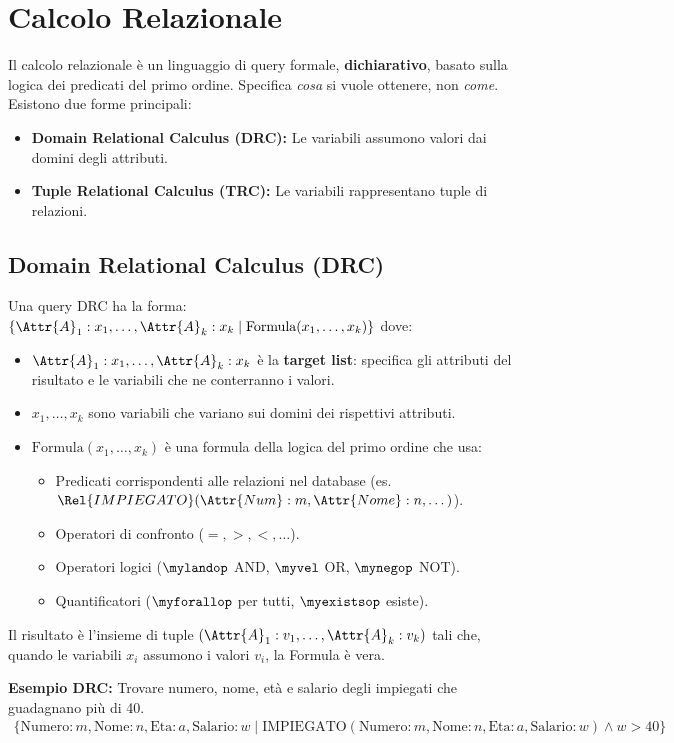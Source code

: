 \section{Calcolo Relazionale}
Il calcolo relazionale è un linguaggio di query formale, \textbf{dichiarativo}, basato sulla logica dei predicati del primo ordine. Specifica \textit{cosa} si vuole ottenere, non \textit{come}.
Esistono due forme principali:
\begin{itemize}
	\item \textbf{Domain Relational Calculus (DRC):} Le variabili assumono valori dai domini degli attributi.
	\item \textbf{Tuple Relational Calculus (TRC):} Le variabili rappresentano tuple di relazioni.
\end{itemize}

\subsection{Domain Relational Calculus (DRC)}
Una query DRC ha la forma:
$\{ \Attr{A}_1:x_1, \dots, \Attr{A}_k:x_k \mid \text{Formula}(x_1, \dots, x_k) \}$
dove:
\begin{itemize}
	\item $\Attr{A}_1:x_1, \dots, \Attr{A}_k:x_k$ è la \textbf{target list}: specifica gli attributi del risultato e le variabili che ne conterranno i valori.
	\item $x_1, \dots, x_k$ sono variabili che variano sui domini dei rispettivi attributi.
	\item $\text{Formula}(x_1, \dots, x_k)$ è una formula della logica del primo ordine che usa:
	\begin{itemize}
		\item Predicati corrispondenti alle relazioni nel database (es. $\Rel{IMPIEGATO}(\Attr{Num}:m, \Attr{Nome}:n, \dots)$).
		\item Operatori di confronto ($=, >, <, \dots$).
		\item Operatori logici ($\mylandop$ AND, $\myvel$ OR, $\mynegop$ NOT).
		\item Quantificatori ($\myforallop$ per tutti, $\myexistsop$ esiste).
	\end{itemize}
\end{itemize}
Il risultato è l'insieme di tuple $(\Attr{A}_1:v_1, \dots, \Attr{A}_k:v_k)$ tali che, quando le variabili $x_i$ assumono i valori $v_i$, la Formula è vera.

\textbf{Esempio DRC:} Trovare numero, nome, età e salario degli impiegati che guadagnano più di 40.
\begin{align*}
    \{ \text{Numero}:m, \text{Nome}:n, \text{Eta}:a, \text{Salario}:w \mid \text{IMPIEGATO}(\text{Numero}:m, \text{Nome}:n, \text{Eta}:a, \text{Salario}:w) \land w > 40 \}
\end{align*}

